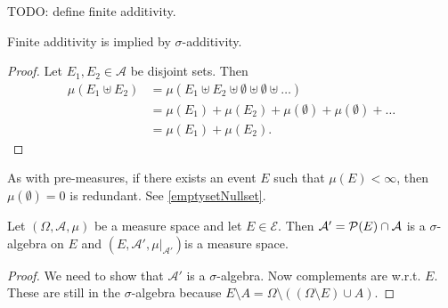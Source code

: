TODO: define finite additivity.

\begin{lemma}
Finite additivity is implied by $\sigma$-additivity.
\end{lemma}
\begin{proof}
Let $E_1,E_2\in\mathcal{A}$ be disjoint sets. Then
\begin{align*}
\mu(E_1\uplus E_2) &= \mu(E_1\uplus E_2 \uplus \emptyset \uplus \emptyset \uplus \ldots) \\
&= \mu(E_1) + \mu(E_2) + \mu(\emptyset) + \mu(\emptyset) + \ldots \\
&= \mu(E_1) + \mu(E_2).
\end{align*}
\end{proof}

As with pre-measures, if there exists an event $E$ such that $\mu(E)< \infty$, then $\mu(\emptyset) = 0$ is redundant. See \ref{emptysetNullset}.

\begin{lemma} \label{submeasurespace}
Let $(\Omega,\mathcal{A},\mu)$ be a measure space and let $E\in\mathcal{E}$. Then $\mathcal{A}' = \operatorname{\mathcal{P}}(E)\cap\mathcal{A}$ is a $\sigma$-algebra on $E$ and $(E,\mathcal{A}',\mu|_{\mathcal{A}'})$is a measure space.
\end{lemma}
\begin{proof}
We need to show that $\mathcal{A}'$ is a $\sigma$-algebra. Now complements are w.r.t. $E$. These are still in the $\sigma$-algebra because $E\setminus A = \Omega\setminus((\Omega\setminus E)\cup A)$.
\end{proof}


